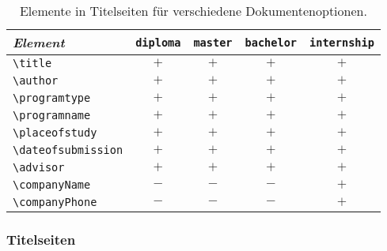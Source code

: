 \begin{table}
\caption{Elemente in Titelseiten für verschiedene Dokumentenoptionen.}
\label{tab:TitelElemente}
\centering\small
\begin{tabular}{lcccc}
\emph{Element} & 
\texttt{diploma} &
\texttt{master} &
\texttt{bachelor} & 
\texttt{internship} 
\\
\hline
\verb!\title! 			& $+$ & $+$ & $+$ & $+$ \\
\verb!\author! 			& $+$ & $+$ & $+$ & $+$ \\
\verb!\programtype! & $+$ & $+$ & $+$ & $+$ \\
\verb!\programname! & $+$ & $+$ & $+$ & $+$ \\
\verb!\placeofstudy! 	& $+$ & $+$ & $+$ & $+$ \\
\verb!\dateofsubmission! 	& $+$ & $+$ & $+$ & $+$ \\
\verb!\advisor! 		& $+$ & $+$ & $+$ & $+$ \\
\verb!\companyName! 			& $-$ & $-$ & $-$ & $+$ \\
\verb!\companyPhone! 	& $-$ & $-$ & $-$ & $+$ \\
\hline
\end{tabular}
\end{table}



\subsubsection{Titelseiten}

